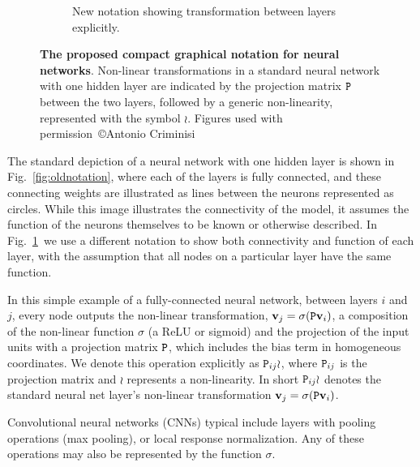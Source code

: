 \documentclass[thesis]{subfiles}
\begin{document}
\begin{figure}[htbp!]
\begin{subfigure}[b]{0.4\textwidth}
   \caption{New notation showing transformation between layers explicitly.}
   \label{fig:newnotation}
\end{subfigure}
\caption[New graphical notation for a standard neural network with one hidden layer.]{{\bf The proposed compact graphical notation for neural networks}. Non-linear transformations in a standard neural network with one hidden layer are indicated by the projection matrix $\mat P$ between the two layers, followed by a generic non-linearity, represented with the symbol $\wr$. Figures used with permission~\copyright Antonio Criminisi}
\label{fig:newGraphLanguage}
\end{figure}

The standard depiction of a neural network with one hidden layer is shown in Fig.~\ref{fig:oldnotation}, where each of the layers is fully connected, and these connecting weights are illustrated as lines between the neurons represented as circles. While this image illustrates the connectivity of the model, it assumes the function of the neurons themselves to be known or otherwise described. In Fig.~\ref{fig:newnotation}\ we use a different notation to show both connectivity and function of each layer, with the assumption that all nodes on a particular layer have the same function.

In this simple example of a fully-connected neural network, between layers $i$ and $j$, every node outputs the non-linear transformation, $\vec v_j = \sigma(\mat P \vec v_i)$, a composition of the non-linear function $\sigma$ (\eg a ReLU or sigmoid) and the projection of the input units with a projection matrix $\mat P$, which includes the bias term in homogeneous coordinates. We denote this operation explicitly as $\mat P_{ij} \wr$, where $\mat P_{ij}$ is the projection matrix and $\wr$ represents a non-linearity. In short $\mat P_{ij} \wr$ denotes the standard neural net layer's non-linear transformation $\vec v_j = \sigma(\mat P \vec v_i)$. 

Convolutional neural networks (CNNs) typical include layers with pooling operations (\eg max pooling), or local response normalization. Any of these operations may also be represented by the function $\sigma$.
\end{document}

